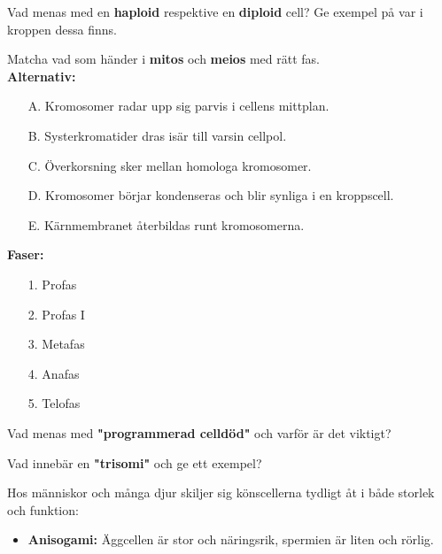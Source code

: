 \documentclass{exam}
\begin{document}
\begin{questions}
\question Vad menas med en \textbf{haploid} respektive en \textbf{diploid} cell? Ge exempel på var i kroppen dessa finns.
\vspace{30mm}

\question Matcha vad som händer i \textbf{mitos} och \textbf{meios} med rätt fas.\\

\textbf{Alternativ:}
\begin{itemize}
  \item[A.] Kromosomer radar upp sig parvis i cellens mittplan.
  \item[B.] Systerkromatider dras isär till varsin cellpol.
  \item[C.] Överkorsning sker mellan homologa kromosomer.
  \item[D.] Kromosomer börjar kondenseras och blir synliga i en kroppscell.
  \item[E.] Kärnmembranet återbildas runt kromosomerna.
\end{itemize}

\textbf{Faser:}
\begin{itemize}
  \item[1.] Profas
  \item[2.] Profas I
  \item[3.] Metafas
  \item[4.] Anafas
  \item[5.] Telofas
\end{itemize}
\vspace{5mm}
\question Vad menas med \textbf{"programmerad celldöd"} och varför är det viktigt?
\vspace{30mm}

\question Vad innebär en \textbf{"trisomi"} och ge ett exempel?
\vspace{25mm}


\break

\vspace{5mm} %
\begin{center}
\end{center}

\question
Hos människor och många djur skiljer sig könscellerna tydligt åt i både storlek och funktion:
\begin{itemize}
  \item \textbf{Anisogami:} Äggcellen är stor och näringsrik, spermien är liten och rörlig.
\end{itemize}


\end{questions}
\end{document}
